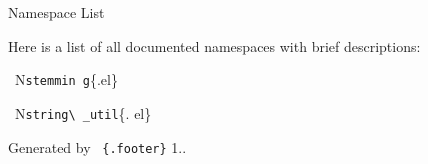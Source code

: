Namespace List











Here is a list of all documented namespaces with brief descriptions\+:







  N{\tt stemmin g}\{.el\}

  N{\tt string\textbackslash{} \+\_\+util}\{. el\} 





 



Generated by  {\tt \{.footer\}} 1.. 